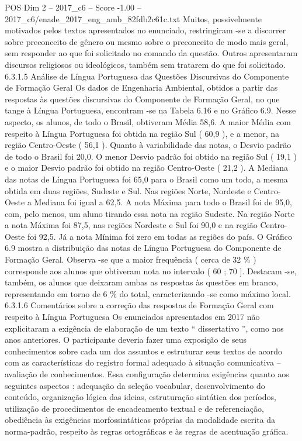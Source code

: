 \begin{textsample}{POS Dim 2 – 2017\_c6 – Score -1.00 – 2017\_c6/enade\_2017\_eng\_amb\_82fdb2c61c.txt}
Muitos, possivelmente motivados pelos textos apresentados no enunciado, restringiram -se a discorrer sobre preconceito de gênero ou mesmo sobre o preconceito de modo mais geral, sem responder ao que foi solicitado no comando da questão.
Outros apresentaram discursos religiosos ou ideológicos, também sem tratarem do que foi solicitado. 6.3.1.5 Análise de Língua Portuguesa das Questões Discursivas do Componente de Formação Geral Os dados de Engenharia Ambiental, obtidos a partir das respostas às questões discursivas do Componente de Formação Geral, no que tange à Língua Portuguesa, encontram -se na Tabela 6.16 e no Gráfico 6.9.
Nesse aspecto, os alunos, de todo o Brasil, obtiveram Média 58,6.
A maior Média com respeito à Língua Portuguesa foi obtida na região Sul ( 60,9 ), e a menor, na região Centro-Oeste ( 56,1 ).
Quanto à variabilidade das notas, o Desvio padrão de todo o Brasil foi 20,0.
O menor Desvio padrão foi obtido na região Sul ( 19,1 ) e o maior Desvio padrão foi obtido na região Centro-Oeste ( 21,2 ).
A Mediana das notas de Língua Portuguesa foi 65,0 para o Brasil como um todo, a mesma obtida em duas regiões, Sudeste e Sul.
Nas regiões Norte, Nordeste e Centro-Oeste a Mediana foi igual a 62,5.
A nota Máxima para todo o Brasil foi de 95,0, com, pelo menos, um aluno tirando essa nota na região Sudeste.
Na região Norte a nota Máxima foi 87,5, nas regiões Nordeste e Sul foi 90,0 e na região Centro-Oeste foi 92,5.
Já a nota Mínima foi zero em todas as regiões do país.
O Gráfico 6.9 mostra a distribuição das notas de Língua Portuguesa do Componente de Formação Geral.
Observa -se que a maior frequência ( cerca de 32 \% ) corresponde aos alunos que obtiveram nota no intervalo ( 60 ; 70 ].
Destacam -se, também, os alunos que deixaram ambas as respostas às questões em branco, representando em torno de 6 \% do total, caracterizando -se como máximo local. 6.3.1.6 Comentários sobre a correção das respostas de Formação Geral com respeito à Língua Portuguesa Os enunciados apresentados em 2017 não explicitaram a exigência de elaboração de um texto “ dissertativo ”, como nos anos anteriores.
O participante deveria fazer uma exposição de seus conhecimentos sobre cada um dos assuntos e estruturar seus textos de acordo com as características do registro formal adequado à situação comunicativa – avaliação de conhecimentos.
Essa configuração determina exigências quanto aos seguintes aspectos : adequação da seleção vocabular, desenvolvimento do conteúdo, organização lógica das ideias, estruturação sintática dos períodos, utilização de procedimentos de encadeamento textual e de referenciação, obediência às exigências morfossintáticas próprias da modalidade escrita da norma-padrão, respeito às regras ortográficas e às regras de acentuação gráfica.

\end{textsample}
